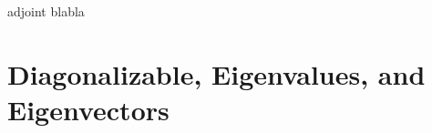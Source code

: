 \documentclass{book}
\begin{document}
adjoint blabla


\section{Diagonalizable, Eigenvalues, and Eigenvectors}



\end{document}
